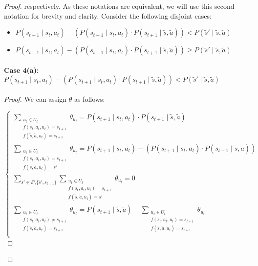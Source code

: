 \begin{proof}
respectively. As these notations are equivalent, we will use this second notation for brevity and clarity. Consider the following disjoint cases:

\begin{itemize}
    \item $P(s_{t+1} \mid s_t, a_t) - (P(s_{t+1} \mid s_t, a_t) \cdot P(s_{t+1} \mid \tilde{s}, \tilde{a})) < P(\tilde{s}' \mid \tilde{s}, \tilde{a})$
    \item $P(s_{t+1} \mid s_t, a_t) - (P(s_{t+1} \mid s_t, a_t) \cdot P(s_{t+1} \mid \tilde{s}, \tilde{a})) \geq P(\tilde{s}' \mid \tilde{s}, \tilde{a})$
\end{itemize}

\pagebreak
\paragraph{Case 4(a): $P(s_{t+1} \mid s_t, a_t) - (P(s_{t+1} \mid s_t, a_t) \cdot P(s_{t+1} \mid \tilde{s}, \tilde{a})) < P(\tilde{s}' \mid \tilde{s}, \tilde{a})$}
\noindent
\begin{proof}
We can assign $\theta$ as follows:

\[
\begin{cases}
    \sum_{\substack{u_t \in U_t \\f(s_t, a_t, u_t) = s_{t+1} \\ f(\tilde{s}, \tilde{a}, u_t) = s_{t+1}}}{\theta_{u_t}} = P(s_{t+1} \mid s_t, a_t) \cdot P(s_{t+1} \mid \tilde{s}, \tilde{a})\\
    
    \sum_{\substack{u_t \in U_t \\f(s_t, a_t, u_t) = s_{t+1} \\ f(\tilde{s}, \tilde{a}, u_t) = \tilde{s}'}}{\theta_{u_t}} = P(s_{t+1} \mid s_t, a_t) - (P(s_{t+1} \mid s_t, a_t) \cdot P(s_{t+1} \mid \tilde{s}, \tilde{a})) \\
    
    \sum_{s' \in \mathcal{S}\setminus\{\tilde{s}', s_{t+1}\}}\sum_{\substack{u_t \in U_t \\f(s_t, a_t, u_t) = s_{t+1} \\ f(\tilde{s}, \tilde{a}, u_t) = s'}}{\theta_{u_t}} = 0\\
    
    \sum_{\substack{u_t \in U_t \\f(s_t, a_t, u_t) \neq s_{t+1} \\ f(\tilde{s}, \tilde{a}, u_t) = s_{t+1}}}{\theta_{u_t}} = P(s_{t+1} \mid \tilde{s}, \tilde{a}) - \sum_{\substack{u_t \in U_t \\f(s_t, a_t, u_t) = s_{t+1} \\ f(\tilde{s}, \tilde{a}, u_t) = s_{t+1}}}{\theta_{u_t}} \\
    

\end{cases}\]
\end{proof}
\end{proof}
